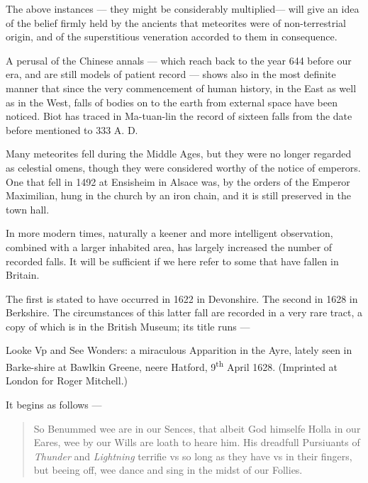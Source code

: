 \documentclass[a4paper, 12pt, oneside, polutonikogreek, english]{article}
\begin{document}
The above instances --- they might be considerably multiplied--- will give an idea of the belief firmly held by the ancients that meteorites were of non-terrestrial origin, and of the superstitious veneration accorded to them in consequence.

A perusal of the Chinese annals --- which reach back to the year 644 before our era, and are still models of patient record --- shows also in the most definite manner that since the very commencement of human history, in the East as well as in the West, falls of bodies on to the earth from external space have been noticed. Biot has traced in Ma-tuan-lin the record of sixteen falls from the date before mentioned to 333 A. D.

Many meteorites fell during the Middle Ages, but they were no longer regarded as celestial omens, though they were considered worthy of the notice of emperors. One that fell in 1492 at Ensisheim in Alsace was, by the orders of the Emperor Maximilian, hung in the church by an iron chain, and it is still preserved in the town hall.

In more modern times, naturally a keener and more intelligent observation, combined with a larger inhabited area, has largely increased the number of recorded falls. It will be sufficient if we here refer to some that have fallen in Britain.

The first is stated to have occurred in 1622 in Devonshire. The second in 1628 in Berkshire. The circumstances of this latter fall are recorded in a very rare tract, a copy of which is in the British Museum; its title runs ---

Looke Vp and See Wonders: a miraculous Apparition in the Ayre, lately seen in Barke-shire at Bawlkin Greene, neere Hatford, 9\textsuperscript{th} April 1628. (Imprinted at London for Roger Mitchell.)

It begins as follows ---
\begin{quotation}
So Benummed wee are in our Sences, that albeit God himselfe Holla in our Eares, wee by our Wills are loath to heare him. His dreadfull Pursiuants of \emph{Thunder} and \emph{Lightning} terrifie vs so long as they have vs in their fingers, but beeing off, wee dance and sing in the midst of our Follies.
\end{quotation}
\end{document}
